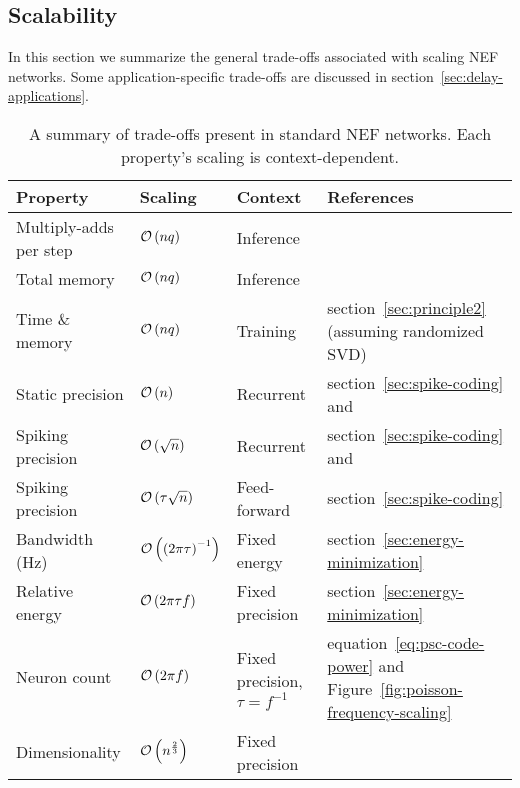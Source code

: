 \subsection{Scalability}
\label{sec:scalability}

In this section we summarize the general trade-offs associated with scaling NEF networks.
Some application-specific trade-offs are discussed in section~\ref{sec:delay-applications}.

\begin{sidewaystable}
\centering
  \begin{tabular}{@{}llll@{}} \toprule
    Property & Scaling & Context & References \\
    \midrule
    Multiply-adds per step & $\mathcal{O}\left({nq}\right)$ & Inference & \citet{voelker2018} \\
    Total memory & $\mathcal{O}\left({nq}\right)$ & Inference & \citet{mundy2015, voelker2018} \\
    Time \& memory & $\mathcal{O}\left({nq}\right)$ & Training & section~\ref{sec:principle2} (assuming randomized SVD) \\
    Static precision & $\mathcal{O}\left({n}\right)$ & Recurrent & section~\ref{sec:spike-coding} and \citet[][p.~47]{eliasmith2003a} \\
    Spiking precision & $\mathcal{O}\left({\sqrt{n}}\right)$ & Recurrent & section~\ref{sec:spike-coding} and \citet[][p.~47]{eliasmith2003a} \\
    Spiking precision & $\mathcal{O}\left({\tau \sqrt{n}}\right)$ & Feed-forward & section~\ref{sec:spike-coding} \\
    Bandwidth (Hz) & $\mathcal{O}\left({\left(2\pi \tau \right)^{-1}}\right)$ & Fixed energy & section~\ref{sec:energy-minimization} \\
    Relative energy & $\mathcal{O}\left({2\pi \tau f }\right)$ & Fixed precision & section~\ref{sec:energy-minimization} \\
    Neuron count & $\mathcal{O}\left({2 \pi f}\right)$ & Fixed precision, $\tau = f^{-1}$ & equation~\ref{eq:psc-code-power} and Figure~\ref{fig:poisson-frequency-scaling} \\
    Dimensionality & $\mathcal{O}\left({ n^{\frac{2}{3}} }\right)$ & Fixed precision & \citet[][p.~60]{gosmann2018} \\ %
    \bottomrule
  \end{tabular}
  \caption{ \label{tab:scalability}
    A summary of trade-offs present in standard NEF networks.
    Each property's scaling is context-dependent.
  }
\end{sidewaystable}

